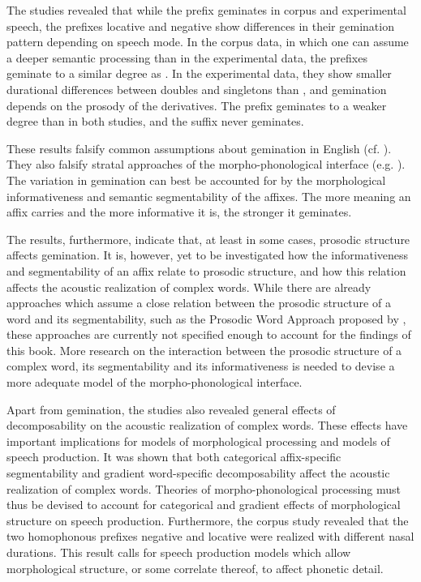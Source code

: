  
The studies revealed that while the prefix  geminates in corpus and experimental speech, the prefixes locative  and negative  show differences in their gemination pattern depending on speech mode. In the corpus data, in which one can assume a deeper semantic processing than in the experimental data, the prefixes geminate to a similar degree as . In the experimental data, they show smaller durational differences between doubles and singletons than , and gemination depends on the prosody of the derivatives. The prefix  geminates to a weaker degree than  in both studies, and the suffix   never geminates.

These results falsify common assumptions about gemination in English (cf. ). They also falsify stratal approaches of the morpho-phonological interface (e.g. \citealt{Kiparsky.1982,Kiparsky.1985,Mohanan.1986,BermudezOtero.2012,Kiparsky.2015,BermudezOtero.2017}). 
The variation in gemination can best be accounted for by the morphological informativeness and semantic segmentability of the affixes. The more meaning an affix carries and the more informative it is, the stronger it geminates. 

The results, furthermore, indicate that, at least in some cases, prosodic structure affects gemination. It is, however, yet to be investigated how the informativeness and segmentability of an affix relate to prosodic structure, and how this relation affects the acoustic realization of complex words. 
While there are already approaches which assume a close relation between the prosodic structure of a word and its segmentability, such as the Prosodic Word Approach proposed by \cite{Raffelsiefen.1999}, these approaches are currently not specified enough to account for the findings of this book.  More research on the interaction between the prosodic structure of a complex word, its segmentability and its  informativeness is needed to devise a more adequate model of the morpho-phonological interface.

Apart from gemination, the studies also revealed general effects of decomposability on the acoustic realization of complex words. These effects have important implications for models of morphological processing and models of speech production. It was shown that both categorical affix-specific segmentability and gradient word-specific decomposability affect the acoustic realization of complex words. Theories of morpho-phonological processing must thus be devised to account for categorical and gradient effects of morphological structure on speech production.
Furthermore, the corpus study revealed that the two homophonous prefixes negative  and locative  were realized with different nasal durations. This result calls for speech production models which allow morphological structure, or some correlate thereof, to affect phonetic detail. 

